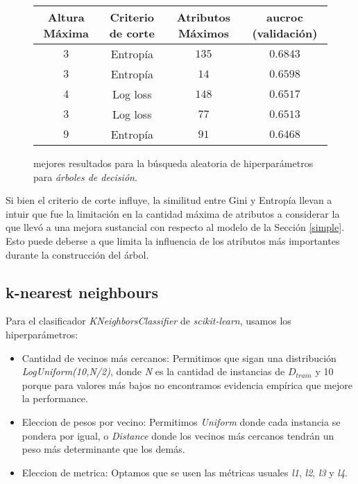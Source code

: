 \vspace{0.5em}
\begin{figure}[!htbp]
    \begin{center}
        \begin{tabular}{ |c|c|c|c| } 
         \hline
        Altura Máxima   & Criterio de corte & Atributos Máximos  & aucroc (validación) \\
        \hline
        $3$             & Entropía          &  $135$            & $0.6843$  \\ 
        $3$             & Entropía          &  $14$             & $0.6598$  \\
        $4$             & Log loss          &  $148$            & $0.6517$  \\ 
        $3$             & Log loss          &  $77$             & $0.6513$  \\
        $9$             & Entropía          &  $91$             & $0.6468$  \\ 
        \hline
        \end{tabular}
    \end{center}
    \caption{mejores resultados para la búsqueda aleatoria de hiperparámetros para \textit{árboles de decisión}.} \label{random_tree}
\end{figure}

Si bien el criterio de corte influye, la similitud entre Gini y Entropía llevan a intuir que fue la limitación en la cantidad máxima de atributos a considerar la que llevó a una mejora sustancial con respecto al modelo de la Sección \ref{simple}. Esto puede deberse a que limita la influencia de los atributos más importantes durante la construcción del árbol.

\subsection{k-nearest neighbours}
Para el clasificador \textit{KNeighborsClassifier} de \textit{scikit-learn}, usamos los hiperparámetros:

\begin{itemize}
    \item Cantidad de vecinos más cercanos: Permitimos que sigan una distribución \textit{LogUniform(10,N/2)}, donde \textit{N} es la cantidad de instancias de $D_{train}$ y 10 porque para valores más bajos no encontramos evidencia empírica que mejore la performance. 
    \item Eleccion de pesos por vecino: Permitimos \textit{Uniform} donde cada instancia se pondera por igual, o \textit{Distance} donde los vecinos más cercanos tendrán un peso más determinante que los demás.
    \item Eleccion de metrica: Optamos que se usen las métricas usuales \textit{l1}, \textit{l2}, \textit{l3} y \textit{l4}. 
\end{itemize}

